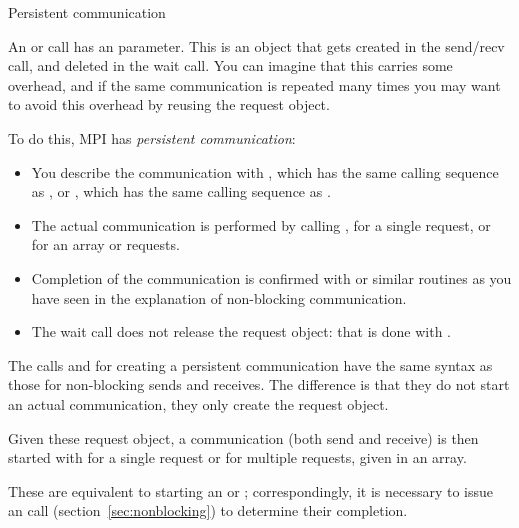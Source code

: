 

 {Persistent communication}
\label{sec:persistent}

An  or  call has an
 parameter.  This is an object that gets
created in the send/recv call, and deleted in the wait call. You can
imagine that this carries some overhead, and if the same communication
is repeated many times you may want to avoid this overhead by reusing
the request object.

To do this, MPI has \emph{persistent communication}:
\begin{itemize}
\item You describe the communication with
  , which has the same calling sequence as
  , or , which has the same
  calling sequence as .
\item The actual communication is performed by calling
  , for a single request, or
   for an array or requests.
\item Completion of the communication is confirmed with
   or similar routines as you have seen in the
  explanation of non-blocking communication.
\item The wait call does not release the request object: that is done
  with .
\end{itemize}

The calls  and 
for creating a persistent communication have the same syntax as 
those for non-blocking sends and receives. The difference is that they do not start
an actual communication, they only create the request object.

Given these request object, a communication (both send and receive) is then started
with  for a single request or  for 
multiple requests, given in an array.

These are equivalent to starting an  or
; correspondingly, it is necessary to issue an
 call (section~\ref{sec:nonblocking}) to
determine their completion.

